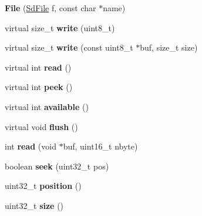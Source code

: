 \begin{DoxyCompactItemize}
\item 
\hypertarget{class_file_ad34490d697d9e56859f566534b360c54}{}{\bfseries File} (\hyperlink{class_sd_file}{Sd\+File} f, const char $\ast$name)\label{class_file_ad34490d697d9e56859f566534b360c54}

\item 
\hypertarget{class_file_acee911dcb9057b964fd5b3ce888a934b}{}virtual size\+\_\+t {\bfseries write} (uint8\+\_\+t)\label{class_file_acee911dcb9057b964fd5b3ce888a934b}

\item 
\hypertarget{class_file_aa531c1641a2363e1f6b9d103f37433da}{}virtual size\+\_\+t {\bfseries write} (const uint8\+\_\+t $\ast$buf, size\+\_\+t size)\label{class_file_aa531c1641a2363e1f6b9d103f37433da}

\item 
\hypertarget{class_file_a4c46a1975e66c37977bf07c58ec10b4e}{}virtual int {\bfseries read} ()\label{class_file_a4c46a1975e66c37977bf07c58ec10b4e}

\item 
\hypertarget{class_file_a0e5025f39bd584563bfe4b05fc1db268}{}virtual int {\bfseries peek} ()\label{class_file_a0e5025f39bd584563bfe4b05fc1db268}

\item 
\hypertarget{class_file_acf613c4e75bae85f543b30e701ebcc44}{}virtual int {\bfseries available} ()\label{class_file_acf613c4e75bae85f543b30e701ebcc44}

\item 
\hypertarget{class_file_af87fa862de707575b8badd044a5af80e}{}virtual void {\bfseries flush} ()\label{class_file_af87fa862de707575b8badd044a5af80e}

\item 
\hypertarget{class_file_a30539792f063f24ee5ee7c11dfa564b2}{}int {\bfseries read} (void $\ast$buf, uint16\+\_\+t nbyte)\label{class_file_a30539792f063f24ee5ee7c11dfa564b2}

\item 
\hypertarget{class_file_a2a46cc148ddc53fe5170164227a695ae}{}boolean {\bfseries seek} (uint32\+\_\+t pos)\label{class_file_a2a46cc148ddc53fe5170164227a695ae}

\item 
\hypertarget{class_file_aae991c597c0bc4c5eb44c1f3b06a21ec}{}uint32\+\_\+t {\bfseries position} ()\label{class_file_aae991c597c0bc4c5eb44c1f3b06a21ec}

\item 
\hypertarget{class_file_a603d3cd3319142d00a7ebd434970b017}{}uint32\+\_\+t {\bfseries size} ()\label{class_file_a603d3cd3319142d00a7ebd434970b017}


\end{DoxyCompactItemize}
